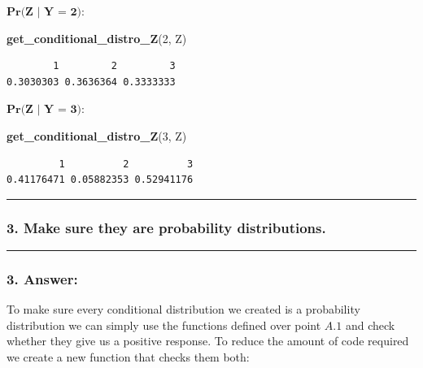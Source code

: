 \documentclass[
]{article}
\newenvironment{Shaded}{\begin{snugshade}}{\end{snugshade}}
\newcommand{\DecValTok}[1]{\textcolor[rgb]{0.00,0.00,0.81}{#1}}
\newcommand{\FunctionTok}[1]{\textcolor[rgb]{0.13,0.29,0.53}{\textbf{#1}}}
\newcommand{\NormalTok}[1]{#1}
\begin{document}
\vspace{0.5cm}

\(\textbf{Pr(Z | Y = 2)}\):

\begin{Shaded}
\begin{Highlighting}[]
\FunctionTok{get\_conditional\_distro\_Z}\NormalTok{(}\DecValTok{2}\NormalTok{, Z)}
\end{Highlighting}
\end{Shaded}

\begin{verbatim}
        1         2         3 
0.3030303 0.3636364 0.3333333 
\end{verbatim}

\vspace{0.5cm}

\(\textbf{Pr(Z | Y = 3)}\):

\begin{Shaded}
\begin{Highlighting}[]
\FunctionTok{get\_conditional\_distro\_Z}\NormalTok{(}\DecValTok{3}\NormalTok{, Z)}
\end{Highlighting}
\end{Shaded}

\begin{verbatim}
         1          2          3 
0.41176471 0.05882353 0.52941176 
\end{verbatim}

\begin{center}\rule{0.5\linewidth}{0.5pt}\end{center}

\hypertarget{make-sure-they-are-probability-distributions.}{%
\subsubsection{3. Make sure they are probability
distributions.}\label{make-sure-they-are-probability-distributions.}}

\begin{center}\rule{0.5\linewidth}{0.5pt}\end{center}

\hypertarget{answer-2}{%
\subsubsection{3. Answer:}\label{answer-2}}

To make sure every conditional distribution we created is a probability
distribution we can simply use the functions defined over point \(A.1\)
and check whether they give us a positive response. To reduce the amount
of code required we create a new function that checks them both:
\end{document}

